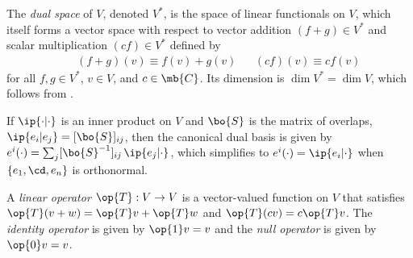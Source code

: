 \documentclass[11pt,fleqn]{article}
\numberwithin{equation}{section}
\begin{document}
\begin{dfn}
The \textit{dual space} of $V$, denoted $V^*$, is the space of linear functionals on $V$, which itself forms a vector space with respect to vector addition $(f+g)\in V^*$ and scalar multiplication $(cf)\in V^*$ defined by
\begin{align}
&&
  (f+g)(v)
\equiv
  f(v) + g(v)
&&
  (cf)(v)
\equiv
  cf(v)
\end{align}
for all $f,g\in V^*$, $v\in V$, and $c\in\mb{C}$.
Its dimension is $\dim V^*=\dim V$, which follows from .
\end{dfn}

\begin{pro}\label{canonical-dual-basis}
\end{pro}

\begin{rmk}
If $\ip{\cdot|\cdot}$ is an inner product on $V$ and $\bo{S}$ is the matrix of overlaps, $\ip{e_i|e_j}=[\bo{S}]_{ij}$, then the canonical dual basis is given by $e^i(\cdot)=\sum_j[\bo{S}^{-1}]_{ij}\,\ip{e_j|\cdot}$, which simplifies to $e^i(\cdot)=\ip{e_i|\cdot}$ when $\{e_1,\cd,e_n\}$ is orthonormal.
\end{rmk}

\begin{dfn}
A \textit{linear operator} $\op{T}:V\rightarrow V$ is a vector-valued function on $V$ that satisfies $\op{T}(v+w)=\op{T}v + \op{T}w$ and $\op{T}(cv)=c\op{T}v$.
The \textit{identity operator} is given by $\op{1}v=v$ and the \textit{null operator} is given by $\op{0}v=v$.
\end{dfn}
\end{document}
